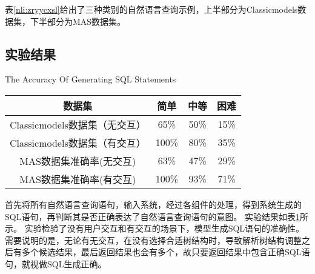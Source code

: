 表\ref{nli:zryycxsl}给出了三种类别的自然语言查询示例，上半部分为Classicmodels数据集，下半部分为MAS数据集。

\subsection{实验结果}

\begin{table}[!hpb]
  \centering
    {The Accuracy Of Generating SQL Statements}
  \label{nli:mxscsyjdzqx}
  \begin{tabular}{cccc} \toprule
    数据集 & 简单 & 中等 & 困难\\
    \midrule
    Classicmodels数据集（无交互）& 65\% & 50\% & 15\% \\
    Classicmodels数据集（有交互）& 100\% & 80\% & 35\% \\
    MAS数据集准确率(无交互) & 63\% & 47\% & 29\% \\
    MAS数据集准确率(有交互) & 100\% & 93\% & 71\% \\
    \bottomrule
  \end{tabular}
\end{table}

首先将所有自然语言查询语句，输入系统，经过各组件的处理，得到系统生成的SQL语句，再判断其是否正确表达了自然语言查询语句的意图。
实验结果如表\ref{nli:mxscsyjdzqx}所示。
实验检验了没有用户交互和有交互的场景下，模型生成SQL语句的准确性。
需要说明的是，无论有无交互，在没有选择合适树结构时，导致解析树结构调整之后有多个候选结果，最后返回结果也会有多个，故只要返回结果中包含正确SQL语句，就视做SQL生成正确。





